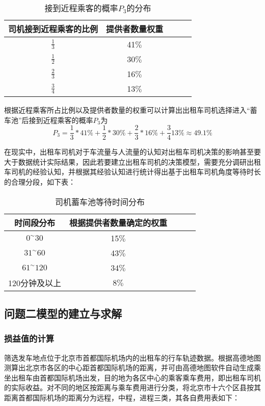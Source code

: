 \documentclass[withoutpreface,bwprint]{cumcmthesis} %
\begin{document}
\begin{table}[!htbp]
	\caption{接到近程乘客的概率$P_3$的分布}\label{tab:001} \centering
	\begin{tabular}{ccccc}
		\toprule[1.5pt]
		司机接到近程乘客的比例& 提供者数量权重\\
		\midrule[1pt]
		$\frac{1}{3}$ & 41$\%$\\
		$\frac{1}{2}$ & 30$\%$\\
		$\frac{2}{3}$ & 16$\%$\\
		$\frac{3}{4}$ & 13$\%$\\
		\bottomrule[1.5pt]
	\end{tabular}
\end{table}

根据近程乘客所占比例以及提供者数量的权重可以计算出出租车司机选择进入“蓄车池”后接到近程乘客的概率$P_3$为
$$
P_{3}=\frac{1}{3} * 41 \%+\frac{1}{2} * 30 \%+\frac{2}{3} * 16 \%+\frac{3}{4} 13 \% \approx 49.1 \%
$$

在现实中，出租车司机对于车流量与人流量的认知对出租车司机决策的影响甚至要大于数据统计实际结果，因此若要建立出租车司机的决策模型，需要充分调研出租车司机的经验认知，并根据其经验认知进行统计得出基于出租车司机角度等待时长的合理分段，如下表：
\begin{table}[!htbp]
	\caption{司机蓄车池等待时间分布}\label{tab:001} \centering
	\begin{tabular}{ccccc}
		\toprule[2pt]
		时间段分布& 根据提供者数量确定的权重\\
		\midrule[1pt]
		$0^{\sim} 30$ & 15$\%$\\
		$31^{\sim} 60$ & 43$\%$\\
	    $61^{\sim} 120$ & 34$\%$\\
		120分钟及以上 & 8$\%$\\
		\bottomrule[1.5pt]
	\end{tabular}
\end{table}

\newpage
\subsection{问题二模型的建立与求解}
\subsubsection{损益值的计算}
筛选发车地点位于北京市首都国际机场内的出租车的行车轨迹数据。根据高德地图测算出北京市各区的中心距首都国际机场的距离，并可由高德地图软件自动生成乘坐出租车由首都国际机场出发，目的地为各区中心的乘客乘车费用，即出租车司机的实际收益。对不同的地区按距离与乘车费用进行分类，将北京市十六个区县按其距离首都国际机场的距离分为远程，中程，进程三类，其各自费用表如下：
\end{document}
